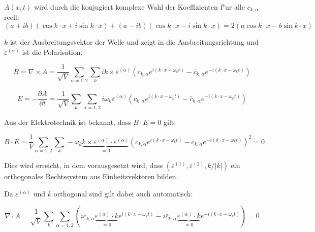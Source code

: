 $A(x,t)$ wird durch die konjugiert komplexe Wahl der Koeffizienten f"ur alle $c_{k,\alpha}$ reell:
\begin{equation*}
(a + ib)(\cos k \cdot x + i \sin k \cdot x ) + (a - ib)(\cos k \cdot x - i \sin k \cdot x ) = 2 ( a \cos k \cdot x - b \sin k \cdot x )
\end{equation*}

$k$ ist der Ausbreitungsvektor der Welle und zeigt in die Ausbreitungsrichtung und $\varepsilon^{(\alpha)}$ ist die Polarisation. 

\begin{equation*}
B = \nabla \times A = \frac{1}{ \sqrt{V}} \sum_{\alpha=1,2}  \sum_k ik \times \varepsilon^{(\alpha)} \left(c_{k,\alpha} e^{i (k \cdot x - \omega_k t)} - \bar{c}_{k,\alpha} e^{-i(k \cdot x - \omega_k t)} \right)
\end{equation*}

\begin{equation*}
E = - \frac{\partial A}{\partial t} = \frac{1}{\sqrt{V}} \sum_k \sum_{\alpha=1,2} i \omega_k \varepsilon^{(\alpha)} \left(c_{k,\alpha} e^{i (k \cdot x - \omega_k t)} - \bar{c}_{k,\alpha} e^{-i(k \cdot x - \omega_k t)} \right)
\end{equation*}

Aus der Elektrotechnik ist bekannt, dass $B \cdot E = 0$ gilt:

\begin{equation*}
B \cdot E = \frac{1}{V} \sum_{\alpha=1,2}   \sum_k -\omega_k \underbrace{k \times  \varepsilon^{(\alpha)} \cdot \varepsilon^{(\alpha)}}_{=0} \left(c_{k,\alpha} e^{i (k \cdot x - \omega_k t)} - \bar{c}_{k,\alpha} e^{-i(k \cdot x - \omega_k t)}\right)^2 = 0
\end{equation*}

Dies wird erreicht, in dem vorausgesetzt wird, dass $(\varepsilon^{(1)}, \varepsilon^{(2)} , k/|k|)$ ein orthogonales Rechtssystem aus Einheitsvektoren bilden.

Da $\varepsilon^{(\alpha)}$ und $k$ orthogonal sind gilt dabei auch automatisch:

\begin{equation*}
\nabla \cdot A = \frac{1}{\sqrt{V}} \sum_k \sum_{\alpha=1,2} \left(i c_{k,\alpha} \underbrace{\varepsilon^{(\alpha)} \cdot k}_{=0} e^{i (k \cdot x - \omega_k t)} - i \bar{c}_{k,\alpha} \underbrace{\varepsilon^{(\alpha)} \cdot k}_{=0} e^{-i(k \cdot x - \omega_k t)}\right) = 0
\end{equation*}


